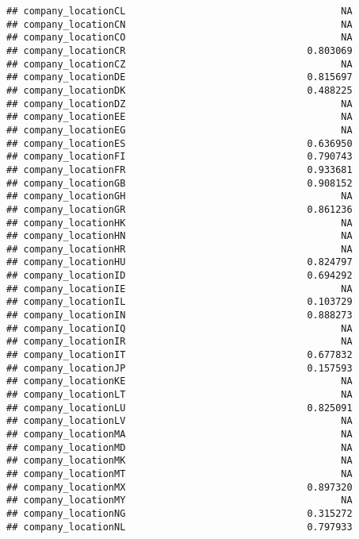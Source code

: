 \documentclass[
]{article}
\begin{document}
\begin{verbatim}
## company_locationCL                                      NA    
## company_locationCN                                      NA    
## company_locationCO                                      NA    
## company_locationCR                                0.803069    
## company_locationCZ                                      NA    
## company_locationDE                                0.815697    
## company_locationDK                                0.488225    
## company_locationDZ                                      NA    
## company_locationEE                                      NA    
## company_locationEG                                      NA    
## company_locationES                                0.636950    
## company_locationFI                                0.790743    
## company_locationFR                                0.933681    
## company_locationGB                                0.908152    
## company_locationGH                                      NA    
## company_locationGR                                0.861236    
## company_locationHK                                      NA    
## company_locationHN                                      NA    
## company_locationHR                                      NA    
## company_locationHU                                0.824797    
## company_locationID                                0.694292    
## company_locationIE                                      NA    
## company_locationIL                                0.103729    
## company_locationIN                                0.888273    
## company_locationIQ                                      NA    
## company_locationIR                                      NA    
## company_locationIT                                0.677832    
## company_locationJP                                0.157593    
## company_locationKE                                      NA    
## company_locationLT                                      NA    
## company_locationLU                                0.825091    
## company_locationLV                                      NA    
## company_locationMA                                      NA    
## company_locationMD                                      NA    
## company_locationMK                                      NA    
## company_locationMT                                      NA    
## company_locationMX                                0.897320    
## company_locationMY                                      NA    
## company_locationNG                                0.315272    
## company_locationNL                                0.797933    

\end{verbatim}
\end{document}
